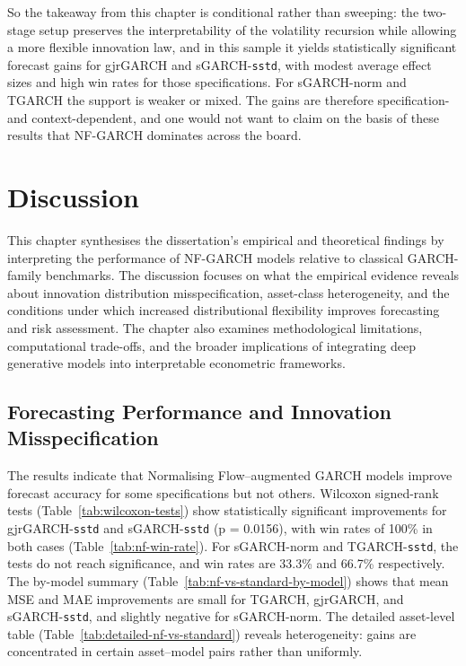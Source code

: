 \documentclass[oneside,12pt]{CUEDthesisPSnPDF}
\begin{document}
\medskip
\noindent
So the takeaway from this chapter is conditional rather than sweeping: the two-stage setup preserves the interpretability of the volatility recursion while allowing a more flexible innovation law, and in this sample it yields statistically significant forecast gains for gjrGARCH and sGARCH-\texttt{sstd}, with modest average effect sizes and high win rates for those specifications. For sGARCH-norm and TGARCH the support is weaker or mixed. The gains are therefore specification- and context-dependent, and one would not want to claim on the basis of these results that NF-GARCH dominates across the board.\\



\chapter{Discussion}
\label{ch:discussion}

\noindent
\noindent
This chapter synthesises the dissertation’s empirical and theoretical findings by interpreting the performance of NF-GARCH models relative to classical GARCH-family benchmarks. The discussion focuses on what the empirical evidence reveals about innovation distribution misspecification, asset-class heterogeneity, and the conditions under which increased distributional flexibility improves forecasting and risk assessment. The chapter also examines methodological limitations, computational trade-offs, and the broader implications of integrating deep generative models into interpretable econometric frameworks.\\

\section{Forecasting Performance and Innovation Misspecification}
\label{sec:disc_forecasting}

\noindent
The results indicate that Normalising Flow–augmented GARCH models improve forecast accuracy for some specifications but not others. Wilcoxon signed-rank tests (Table~\ref{tab:wilcoxon-tests}) show statistically significant improvements for gjrGARCH-\texttt{sstd} and sGARCH-\texttt{sstd} (p = 0.0156), with win rates of 100\% in both cases (Table~\ref{tab:nf-win-rate}). For sGARCH-norm and TGARCH-\texttt{sstd}, the tests do not reach significance, and win rates are 33.3\% and 66.7\% respectively. The by-model summary (Table~\ref{tab:nf-vs-standard-by-model}) shows that mean MSE and MAE improvements are small for TGARCH, gjrGARCH, and sGARCH-\texttt{sstd}, and slightly negative for sGARCH-norm. The detailed asset-level table (Table~\ref{tab:detailed-nf-vs-standard}) reveals heterogeneity: gains are concentrated in certain asset--model pairs rather than uniformly.\\
\end{document}
